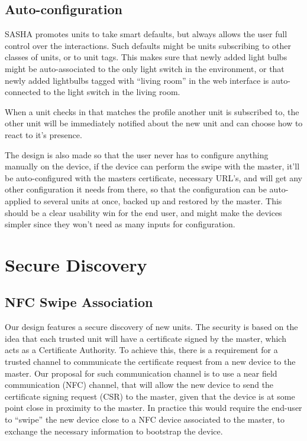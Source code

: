 \subsection{Auto-configuration}
SASHA promotes units to take smart defaults, but always allows the user full control over the interactions. Such defaults might be units subscribing to other classes of units, or to unit tags. This makes sure that newly added light bulbs might be auto-associated to the only light switch in the environment, or that newly added lightbulbs tagged with “living room” in the web interface is auto-connected to the light switch in the living room.

When a unit checks in that matches the profile another unit is subscribed to, the other unit will be immediately notified about the new unit and can choose how to react to it’s presence.

The design is also made so that the user never has to configure anything manually on the device, if the device can perform the swipe with the master, it’ll be auto-configured with the masters certificate, necessary URL’s, and will get any other configuration it needs from there, so that the configuration can be auto-applied to several units at once, backed up and restored by the master. This should be a clear usability win for the end user, and might make the devices simpler since they won’t need as many inputs for configuration.

\section{Secure Discovery}
\subsection{NFC Swipe Association}
Our design features a secure discovery of new units. The security is based on the idea that each trusted unit will have a certificate signed by the master, which acts as a Certificate Authority. To achieve this, there is a requirement for a trusted channel to communicate the certificate request from a new device to the master. Our proposal for such communication channel is to use a near field communication (NFC) channel, that will allow the new device to send the certificate signing request (CSR) to the master, given that the device is at some point close in proximity to the master. In practice this would require the end-user to “swipe” the new device close to a NFC device associated to the master, to exchange the necessary information to bootstrap the device.

